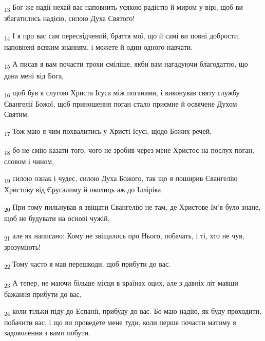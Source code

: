 \begin{tcolorbox}
\textsubscript{13} Бог же надії нехай вас наповнить усякою радістю й миром у вірі, щоб ви збагатились надією, силою Духа Святого!
\end{tcolorbox}
\begin{tcolorbox}
\textsubscript{14} І я про вас сам пересвідчений, браття мої, що й самі ви повні добрости, наповнені всяким знанням, і можете й один одного навчати.
\end{tcolorbox}
\begin{tcolorbox}
\textsubscript{15} А писав я вам почасти трохи сміліше, якби вам нагадуючи благодаттю, що дана мені від Бога,
\end{tcolorbox}
\begin{tcolorbox}
\textsubscript{16} щоб був я слугою Христа Ісуса між поганами, і виконував святу службу Євангелії Божої, щоб приношення поган стало приємне й освячене Духом Святим.
\end{tcolorbox}
\begin{tcolorbox}
\textsubscript{17} Тож маю я чим похвалитись у Христі Ісусі, щодо Божих речей,
\end{tcolorbox}
\begin{tcolorbox}
\textsubscript{18} бо не смію казати того, чого не зробив через мене Христос на послух поган, словом і чином,
\end{tcolorbox}
\begin{tcolorbox}
\textsubscript{19} силою ознак і чудес, силою Духа Божого, так що я поширив Євангелію Христову від Єрусалиму й околиць аж до Ілліріка.
\end{tcolorbox}
\begin{tcolorbox}
\textsubscript{20} При тому пильнував я звіщати Євангелію не там, де Христове Ім'я було знане, щоб не будувати на основі чужій,
\end{tcolorbox}
\begin{tcolorbox}
\textsubscript{21} але як написано: Кому не звіщалось про Нього, побачать, і ті, хто не чув, зрозуміють!
\end{tcolorbox}
\begin{tcolorbox}
\textsubscript{22} Тому часто я мав перешкоди, щоб прибути до вас.
\end{tcolorbox}
\begin{tcolorbox}
\textsubscript{23} А тепер, не маючи більше місця в країнах оцих, але з давніх літ мавши бажання прибути до вас,
\end{tcolorbox}
\begin{tcolorbox}
\textsubscript{24} коли тільки піду до Еспанії, прибуду до вас. Бо маю надію, як буду проходити, побачити вас, і що ви проведете мене туди, коли перше почасти матиму я задоволення з вами побути.
\end{tcolorbox}
